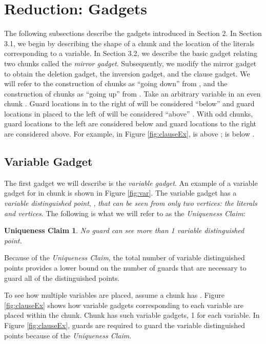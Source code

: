 \documentclass[11pt]{article}
\newtheorem*{uc}{Uniqueness Claim}
\begin{document}
\section{Reduction: Gadgets}
The following subsections describe the gadgets introduced in Section 2. In Section 3.1,
we begin by describing the shape of a chunk and the location of the literals corresponding to a variable.  In
Section 3.2, we describe the basic gadget relating two chunks called the \textit{mirror gadget}.  
Subsequently, we modify the mirror gadget to obtain the deletion gadget, the inversion gadget,
and the clause gadget. We will refer to the construction of chunks  as ``going down''
from , and the construction of chunks  as ``going up'' from
.  Take an arbitrary variable  in an even chunk .  Guard locations in  to the right of  will be considered ``below''  and guard locations in  placed to the left of  will be considered ``above'' .  With odd chunks, guard locations to the left are considered below and guard locations to the right are considered above.  For example, in Figure \ref{fig:clauseEx},  is above ;  is below .

\subsection{Variable Gadget}

The first gadget we will describe is the \textit{variable gadget}.  An example of a variable gadget for  in chunk  is shown in Figure \ref{fig:var}.  The variable gadget has a \textit{variable distinguished point}, , {\em that can be seen from only two vertices: the literals  and  vertices}.  The following is what we will refer to as the {\em Uniqueness Claim}:



\begin{uc}
No guard can see more than 1 variable distinguished point. 
\end{uc}
 
Because of the {\em Uniqueness Claim}, the total number of variable distinguished points provides a lower bound on the number of guards that are necessary to guard all of the distinguished points.

To see how multiple variables are placed, assume a chunk  has .  Figure \ref{fig:clauseEx} shows how variable gadgets corresponding to each variable are placed within the chunk.  Chunk  has  such variable gadgets, 1 for each variable.  In Figure \ref{fig:clauseEx},  guards are required to guard the  variable distinguished points because of the {\em Uniqueness Claim}.  
\end{document}
